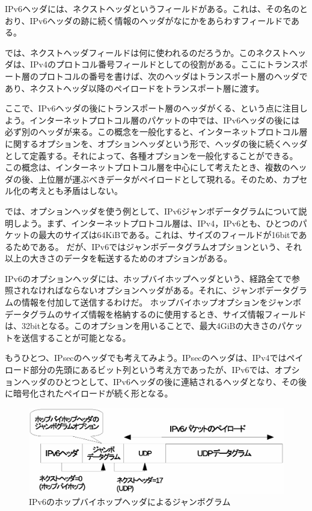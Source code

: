 IPv6ヘッダには、ネクストヘッダというフィールドがある。これは、その名のとおり、IPv6ヘッダの跡に続く情報のヘッダがなにかをあらわすフィールドである。

では、ネクストヘッダフィールドは何に使われるのだろうか。このネクストヘッダは、IPv4のプロトコル番号フィールドとしての役割がある。ここにトランスポート層のプロトコルの番号を書けば、次のヘッダはトランスポート層のヘッダであり、ネクストヘッダ以降のペイロードをトランスポート層に渡す。

ここで、IPv6ヘッダの後にトランスポート層のヘッダがくる、という点に注目しよう。インターネットプロトコル層のパケットの中では、IPv6ヘッダの後には必ず別のヘッダが来る。この概念を一般化すると、インターネットプロトコル層に関するオプションを、オプションヘッダという形で、ヘッダの後に続くヘッダとして定義する。それによって、各種オプションを一般化することができる。
この概念は、インターネットプロトコル層を中心にして考えたとき、複数のヘッダの後、上位層が運ぶべきデータがペイロードとして現れる。そのため、カプセル化の考えとも矛盾はしない。

では、オプションヘッダを使う例として、IPv6ジャンボデータグラムについて説明しよう。まず、インターネットプロトコル層は、IPv4，IPv6とも、ひとつのパケットの最大のサイズは64KiBである。これは、サイズのフィールドが16bitであるためである。
だが、IPv6ではジャンボデータグラムオプションという、それ以上の大きさのデータを転送するためのオプションがある。

IPv6のオプションヘッダには、ホップバイホップヘッダという、経路全てで参照されなければならないオプションヘッダがある。それに、ジャンボデータグラムの情報を付加して送信するわけだ。
ホップバイホップオプションをジャンボデータグラムのサイズ情報を格納するのに使用するとき、サイズ情報フィールドは、32bitとなる。このオプションを用いることで、最大4GiBの大きさのパケットを送信することが可能となる。

もうひとつ、IPsecのヘッダでも考えてみよう。IPsecのヘッダは、IPv4ではペイロード部分の先頭にあるビット列という考え方であったが、IPv6では、オプションヘッダのひとつとして、IPv6ヘッダの後に連結されるヘッダとなり、その後に暗号化されたペイロードが続く形となる。

\begin{figure}
	\includegraphics[width=14cm,clip]{draw/nextheader2.eps}
	\caption{IPv6のホップバイホップヘッダによるジャンボグラム}
	\label{fig:ipv6jumbogram}
\end{figure}

